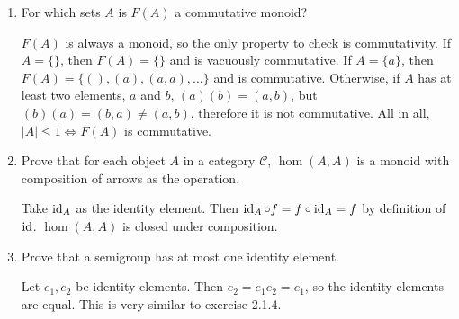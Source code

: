 \begin{enumerate}
    \item For which sets \(A\) is \(F(A)\) a commutative monoid?
          \begin{solution}
              \(F(A)\) is always a monoid, so the only property to check is commutativity. If \(A = \{\}\), then \(F(A) = \{\}\) and is vacuously commutative. If \(A = \{a\}\), then \(F(A) = \{(), (a), (a, a), \dots\}\) and is commutative. Otherwise, if \(A\) has at least two elements, \(a\) and \(b\), \((a)(b) = (a, b)\), but \((b)(a) = (b, a) \neq (a, b)\), therefore it is not commutative. All in all, \(|A| \leq 1 \Leftrightarrow F(A)\) is commutative.
          \end{solution}
    \item Prove that for each object \(A\) in a category \(\mathcal{C}\), \(\hom(A, A)\) is a monoid with composition of arrows as the operation.
          \begin{solution}
              Take \(\operatorname{id}_A\) as the identity element. Then \(\operatorname{id}_A \circ f = f \circ \operatorname{id}_A = f\) by definition of \(\operatorname{id}\). \(\hom(A, A)\) is closed under composition.
          \end{solution}
    \item Prove that a semigroup has at most one identity element.
          \begin{solution}
              Let \(e_1, e_2\) be identity elements. Then \(e_2 = e_1 e_2 = e_1\), so the identity elements are equal. This is very similar to exercise 2.1.4.
          \end{solution}
\end{enumerate}


